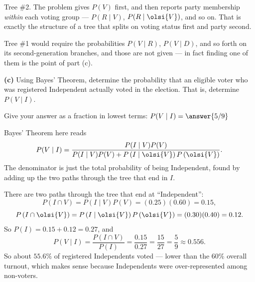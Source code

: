 \documentclass[12pt]{ximera}
\begin{document}
\begin{problem}
\begin{prompt}
\begin{feedback}
Tree \#2. The problem gives $P(V)$ first, and then reports party membership
\emph{within} each voting group --- $P(R\mid V)$, $P(R\mid\olsi{V})$, and so on.
That is exactly the structure of a tree that splits on voting status first and party
second.

Tree \#1 would require the probabilities $P(V\mid R)$, $P(V\mid D)$, and so forth on
its second-generation branches, and those are not given --- in fact finding one of
them is the point of part (c).
\end{feedback}
\end{prompt}

\begin{prompt}
\textbf{(c)} Using Bayes' Theorem, determine the probability that an eligible voter
who was registered Independent actually voted in the election. That is, determine
$P(V\mid I)$.

Give your answer as a fraction in lowest terms: $P(V\mid I)=\answer{5/9}$

\begin{hint}
Bayes' Theorem here reads
\[
P(V\mid I)=\frac{P(I\mid V)P(V)}{P(I\mid V)P(V)+P\left(I\mid\olsi{V}\right)P\left(\olsi{V}\right)}.
\]
The denominator is just the total probability of being Independent, found by adding
up the two paths through the tree that end in $I$.
\end{hint}

\begin{feedback}
There are two paths through the tree that end at ``Independent'':
\[
P(I\cap V)=P(I\mid V)P(V)=(0.25)(0.60)=0.15,
\]
\[
P\left(I\cap\olsi{V}\right)=P\left(I\mid\olsi{V}\right)P\left(\olsi{V}\right)=(0.30)(0.40)=0.12.
\]
So $P(I)=0.15+0.12=0.27$, and
\[
P(V\mid I)=\frac{P(I\cap V)}{P(I)}=\frac{0.15}{0.27}=\frac{15}{27}=\frac59\approx 0.556.
\]
So about $55.6\%$ of registered Independents voted --- lower than the $60\%$ overall
turnout, which makes sense because Independents were over-represented among
non-voters.
\end{feedback}
\end{prompt}
\end{problem}
\end{document}
